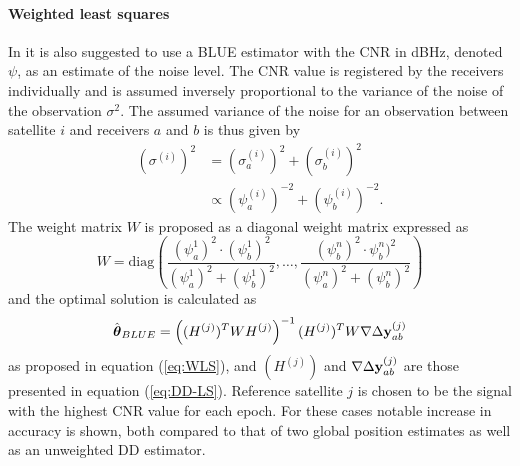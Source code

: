 \paragraph{Weighted least squares}
In \cite{BLUE} it is also suggested to use a BLUE estimator with the CNR in dBHz, denoted $\psi$, as an estimate of the noise level. The CNR value is registered by the receivers individually and is assumed inversely proportional to the variance of the noise of the observation $\sigma^2$. The assumed variance of the noise for an observation between satellite $i$ and receivers $a$ and $b$ is thus given by
\begin{align*}
(\sigma^{(i)})^2&=(\sigma^{(i)}_a)^2+(\sigma^{(i)}_b)^2\\
		&\propto (\psi^{(i)}_a)^{-2}+(\psi^{(i)}_b)^{-2}.
\end{align*} 
The weight matrix $W$ is proposed as a diagonal weight matrix expressed as
\begin{equation}\label{DD_BLUE}
W=\text{diag}\left(\frac{(\psi^1_a)^2\cdot(\psi^1_b)^2}{(\psi^1_a)^2+(\psi^1_b)^2},\dots,\frac{(\psi^n_b)^2\cdot \psi^n_b)^2}{(\psi^n_a)^2+(\psi^n_b)^2}\right)
\end{equation}
and the optimal solution is calculated as 
\begin{align*}
\hat{\boldsymbol \theta}_{BLUE}=\left((H^{(j)})^TWH^{(j)}\right)^{-1}(H^{(j)})^TW\nabla \Delta {\bf y}^{(j)}_{ab}
\end{align*} 
as proposed in equation (\ref{eq:WLS}), and $(H^{(j)})$ and $\nabla \Delta {\bf y}^{(j)}_{ab}$ are those presented in equation (\ref{eq:DD-LS}). Reference satellite $j$ is chosen to be the signal with the highest CNR value for each epoch. For these cases notable increase in accuracy is shown, both compared to that of two global position estimates as well as an unweighted DD estimator. 
